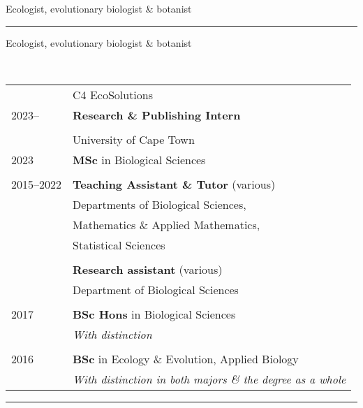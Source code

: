 \documentclass[12pt]{article}
\begin{document}


\begin{center}
  {\large Ecologist, evolutionary biologist \& botanist}
\end{center}

\hrule %

\bigskip

\hspace{6.75em} Ecologist, evolutionary biologist \& botanist

\

\begin{tabular}{ll}
             & C4 EcoSolutions \\
  2023--     & \textbf{Research \& Publishing Intern} \\
             & \\
             & University of Cape Town \\
  2023       & \textbf{MSc} in Biological Sciences \\
             & \\
  2015--2022 & \textbf{Teaching Assistant \& Tutor} (various) \\
             & Departments of Biological Sciences, \\
             & \hspace{1em} Mathematics \& Applied Mathematics, \\
             & \hspace{1em} Statistical Sciences \\
             & \\
             & \textbf{Research assistant} (various) \\
             & Department of Biological Sciences \\
             & \\
  2017       & \textbf{BSc Hons} in Biological Sciences \\
             & \textit{With distinction} \\
             & \\
  2016       & \textbf{BSc} in Ecology \& Evolution, Applied Biology \\
             & \textit{With distinction in both majors \& the degree as a whole}
\end{tabular}

\bigskip

\hrule %
\end{document}
